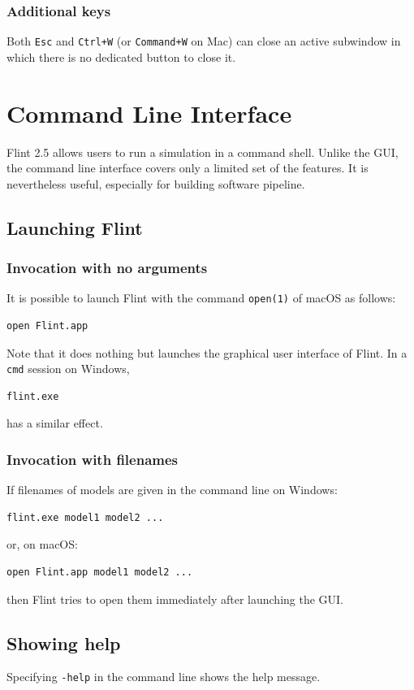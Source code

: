 \documentclass[a4paper,10pt]{report}
\begin{document}
\subsection{Additional keys}
\label{sec:orgfd52e60}
Both \texttt{Esc} and \texttt{Ctrl+W} (or \texttt{Command+W} on Mac) can close an active
subwindow in which there is no dedicated button to close it.

\chapter{Command Line Interface}
\label{sec:org6eb2c39}
Flint 2.5 allows users to run a simulation in a command shell.
Unlike the GUI, the command line interface covers only a limited set of
the features. It is nevertheless useful, especially for building software pipeline.

\section{Launching Flint}
\label{sec:org7fb14fe}

\subsection{Invocation with no arguments}
\label{sec:org82bd718}
It is possible to launch Flint with the command \texttt{open(1)} of macOS as follows:
\begin{verbatim}
open Flint.app
\end{verbatim}
Note that it does nothing but launches the graphical user interface of Flint.
In a \texttt{cmd} session on Windows,
\begin{verbatim}
flint.exe
\end{verbatim}
has a similar effect.

\subsection{Invocation with filenames}
\label{sec:orgd36aedb}
If filenames of models are given in the command line on Windows:
\begin{verbatim}
flint.exe model1 model2 ...
\end{verbatim}
or, on macOS:
\begin{verbatim}
open Flint.app model1 model2 ...
\end{verbatim}
then Flint tries to open them immediately after launching the GUI.

\section{Showing help}
\label{sec:org186ffa5}
Specifying \texttt{-help} in the command line shows the help message.
\end{document}

